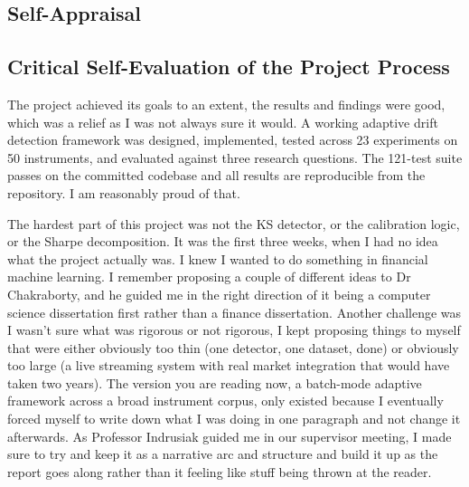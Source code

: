 
\begin{appendices}

\chapter{Self-Appraisal}
\label{app:self_appraisal}

\section{Critical Self-Evaluation of the Project Process}
\label{sec:self_eval}

The project achieved its goals to an extent, the results and findings were good, which was a relief as I was not always sure it would. A working adaptive drift detection framework was designed, 
implemented, tested across 23 experiments on 50 instruments, and evaluated against 
three research questions. The 121-test suite passes on the committed codebase and all 
results are reproducible from the repository. I am reasonably proud of that. 

The hardest part of this project was not the KS detector, or the calibration logic, 
or the Sharpe decomposition. It was the first three weeks, when I had no idea what the 
project actually was. I knew I wanted to do something in financial machine learning. I remember proposing a couple of different ideas to Dr Chakraborty, and he guided me in the right direction of it being a computer science dissertation first rather than a finance dissertation. Another challenge was I wasn't sure what was rigorous or not rigorous, I kept 
proposing things to myself that were either obviously too thin (one detector, one 
dataset, done) or obviously too large (a live streaming system with real market 
integration that would have taken two years). The version you are reading now, a 
batch-mode adaptive framework across a broad instrument corpus, only existed because 
I eventually forced myself to write down what I was doing in one paragraph and not 
change it afterwards. As Professor Indrusiak guided me in our supervisor meeting, I made sure to try and keep it as a narrative arc and structure and build it up as the report goes along rather than it feeling like stuff being thrown at the reader. 


\end{appendices}
